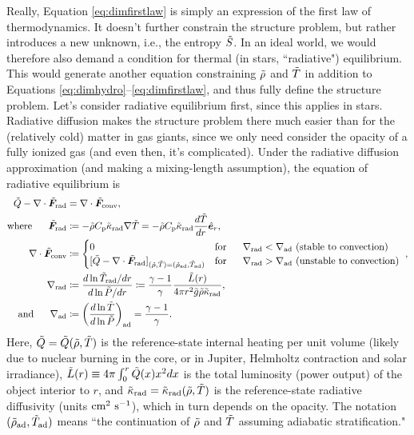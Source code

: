\documentclass[12pt]{article}
\numberwithin{equation}{section}
\begin{document}
Really, Equation \eqref{eq:dimfirstlaw} is simply an expression of the first law of thermodynamics. It doesn't further constrain the structure problem, but rather introduces a new unknown, i.e., the entropy $\tilde{S}$. In an ideal world, we would therefore also demand a condition for thermal (in stars, ``radiative") equilibrium. This would generate another equation constraining $\tilde{\rho}$ and $\tilde{T}$ in addition to Equations \eqref{eq:dimhydro}--\eqref{eq:dimfirstlaw}, and thus fully define the structure problem. Let's consider radiative equilibrium first, since this applies in stars. Radiative diffusion makes the structure problem there much easier than for the (relatively cold) matter in gas giants, since we only need consider the opacity of a fully ionized gas (and even then, it's complicated). Under the radiative diffusion approximation (and making a mixing-length assumption), the equation of radiative equilibrium is
\begin{subequations}\label{eq:dimradequil}
\begin{align}
	\heattilde - \Div\fradtilde &= \Div\fconvtilde\label{eq:dimradequil1},\\
	\where \fradtilde &\define  -\rhotilde \cpcap\kradtilde \nabla\tmptilde=-\rhotilde \cpcap\kradtilde \frac{d\tmptilde}{dr}\er,\label{eq:dimradequil2}\\
	 \Div\fconvtilde &\define \begin{cases} 0 \five &\text{for}\five \nabla_{\rm rad} <\nabla_{\rm ad}\ \text{(stable to convection)}\\
	[\heattilde - \Div\fradtilde]_{(\rhotilde,\tmptilde)=(\rhotilde_{\rm ad}, \tmptilde_{\rm ad})}&\text{for}\five \nabla_{\rm rad} >\nabla_{\rm ad}\ \text{(unstable to convection)}\
		\end{cases},\label{eq:dimradequil3}\\
		\nabla_{\rm rad}&\define \frac{d\ln\tmptilde_{\rm rad}/dr}{d\ln\prstilde/dr} \define \frac{\gamma-1}{\gamma}\frac{\lumtilde\ofr}{4\pi r^2 \gtilde \rhotilde \kradtilde},\label{eq:dimradequil4}\\
		\andd \nabla_{\rm ad}&\define  \left(\frac{d\ln\tmptilde}{d\ln\prstilde}\right)_{\rm ad} = \frac{\gamma-1}{\gamma}.
\end{align}
\end{subequations}
Here, $\tilde{Q}=\tilde{Q}(\tilde{\rho},\tilde{T})$ is the reference-state internal heating per unit volume (likely due to nuclear burning in the core, or in Jupiter, Helmholtz contraction and solar irradiance), $\tilde{L}(r)\equiv 4\pi\int_0^r \tilde{Q}(x) x^2dx$ is the total luminosity (power output) of the object interior to $r$, and $\tilde{\kappa}_{\rm rad}=\tilde{\kappa}_{\rm rad}(\tilde{\rho},\tilde{T})$ is the reference-state radiative diffusivity (units $\rm{cm^2\ s^{-1}}$), which in turn depends on the opacity. The notation $(\tilde{\rho}_{\rm ad}, \tilde{T}_{\rm ad})$ means ``the continuation of $\tilde{\rho}$ and $\tilde{T}$ assuming adiabatic stratification."
\end{document}
